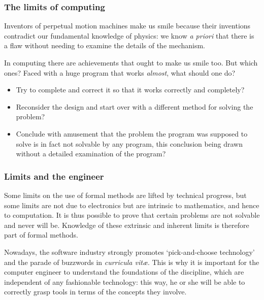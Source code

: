 \documentclass[compress,dvipdfmx]{beamer}
\begin{document}
%
\begin{frame}
  \frametitle{The limits of computing}

  Inventors of perpetual motion machines make us smile because their
  inventions contradict our fundamental knowledge of physics: we know
  \emph{a priori} that there is a flaw without needing to examine the
  details of the mechanism.

  \bigskip

  In computing there are achievements that ought to make us smile
  too. But which ones? Faced with a huge program that works
  \emph{almost}, what should one do?
  \begin{itemize}

    \item Try to complete and correct it so that it works correctly
      and completely?

    \item Reconsider the design and start over with a different method
      for solving the problem?

    \item Conclude with amusement that the problem the program was
      supposed to solve is in fact not solvable by any program, this
      conclusion being drawn without a detailed examination of the
      program?

  \end{itemize}

\end{frame}

%
\begin{frame}
  \frametitle{Limits and the engineer}

  Some limits on the use of formal methods are lifted by technical
  progress, but some limits are not due to electronics but are
  intrinsic to mathematics, and hence to computation. It is thus
  possible to prove that certain problems are not solvable and never
  will be. Knowledge of these extrinsic and inherent limits is
  therefore part of formal methods.

  \bigskip

  Nowadays, the software industry strongly promotes
  `pick\hyp{}and\hyp{}choose technology' and the parade of buzzwords
  in \emph{curricula vitæ}. This is why it is important for the
  computer engineer to understand the foundations of the discipline,
  which are independent of any fashionable technology: this way, he or
  she will be able to correctly grasp tools in terms of the concepts
  they involve.

\end{frame}
\end{document}
